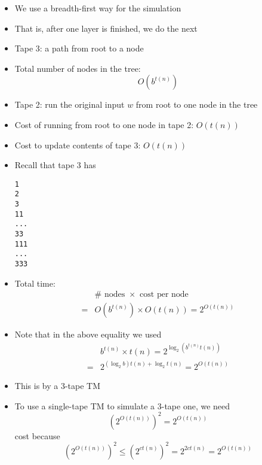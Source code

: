 \begin{frame}
\begin{itemize}
\item We use a breadth-first way for the simulation
\item That is, after one layer is finished, we do the next

\item Tape 3: a path from root to a node

\item Total number of nodes in the tree:
\begin{equation*}
  O(b^{t(n)})
\end{equation*}

\item Tape 2: run the original input $w$ from root to one node in the
  tree

\item Cost of running from root to one node in tape 2: $O(t(n))$

\item Cost to update contents of tape 3: $O(t(n))$
\item []
  Recall that tape 3 has
  \begin{alltt}
1
2
3
11
...
33
111
...
333
\end{alltt}
\item Total time:
  \begin{equation*}
    \begin{split}
& \# \text{ nodes } \times \text{ cost per node}\\      
= &   O(b^{t(n)}) \times O(t(n)) = 2^{O(t(n))}
\end{split}
\end{equation*}
\item Note that in the above equality we used
  \begin{equation*}
    \begin{split}
&      b^{t(n)} \times t(n)
      =    2^{\log_2 (b^{t(n)} t(n))}
\\
= & 2^{(\log_2 b)t(n) + \log_2 t(n)} = 2^{O(t(n))}
    \end{split}
  \end{equation*}

\item This is by a 3-tape TM
\item To use a single-tape TM to simulate a 3-tape one, we need
  \begin{equation*}
(2^{O(t(n))})^2
= 2^{O(t(n))}
\end{equation*}
cost because
\begin{equation*}
  (2^{O(t(n))})^2
\leq (2^{ct(n)})^2
= 2^{2ct(n)} 
= 2^{O(t(n))}
\end{equation*}
\end{itemize}\end{frame}


